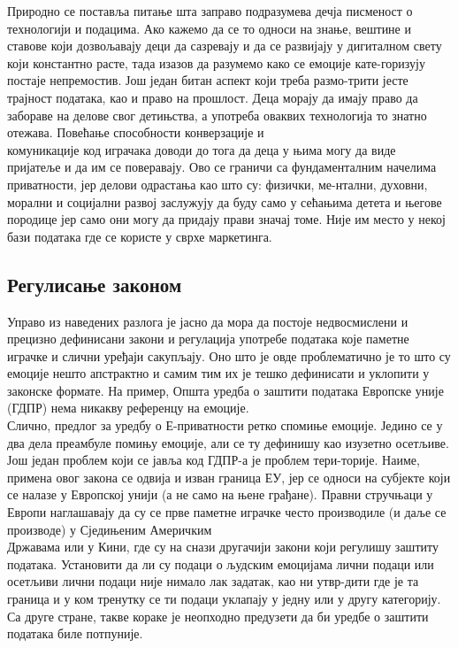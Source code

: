 \documentclass{article}
\begin{document}
Природно се поставља питање шта заправо подразумева дечја писменост о технологији и подацима. Ако кажемо да се то односи на знање, вештине и ставове који дозвољавају деци да сазревају и да се развијају у дигиталном свету који константно расте, тада изазов да разумемо како се емоције кате-горизују постаје непремостив. Још један битан аспект који треба размо-трити јесте трајност података, као и право на прошлост. Деца морају да имају право да забораве на делове свог детињства, а употреба оваквих технологија то знатно отежава. Повећање способности конверзације и \\комуникације код играчака доводи до тога да деца у њима могу да виде пријатеље и да им се поверавају. Ово се граничи са фундаменталним начелима приватности, јер делови одрастања као што су: физички, ме-нтални, духовни, морални и социјални развој заслужују да буду само у сећањима детета и његове породице јер само они могу да придају прави значај томе. Није им место у некој бази података где се користе у сврхе маркетинга.

\subsection{Регулисање законом}
Управо из наведених разлога је јасно да мора да постоје недвосмислени и прецизно дефинисани закони и регулација употребе података које паметне играчке и слични уређаји сакупљају. Оно што је овде проблематично је то што су емоције нешто апстрактно и самим тим их је тешко дефинисати и уклопити у законске формате. На пример, Општа уредба о заштити података Европске уније (ГДПР) нема никакву референцу на емоције. \\Слично, предлог за уредбу о Е-приватности ретко спомиње емоције. Једино се у два дела преамбуле помињу емоције, али се ту дефинишу као изузетно осетљиве.  Још један проблем који се јавља код ГДПР-а је проблем тери-торије. Наиме, примена овог закона се одвија и изван граница ЕУ, јер се односи на субјекте који се налазе у Европској унији (а не само на њене грађане). Правни стручњаци у Европи наглашавају да су се прве паметне играчке често производиле (и даље се производе) у Сједињеним Америчким \\Државама или у Кини, где су на снази другачији закони који регулишу заштиту података. Установити да ли су подаци о људским емоцијама лични подаци или осетљиви лични подаци није нимало лак задатак, као ни утвр-дити где је та граница и у ком тренутку се ти подаци уклапају у једну или у другу категорију. Са друге стране, такве кораке је неопходно предузети да би уредбе о заштити података биле потпуније. 
\end{document}
